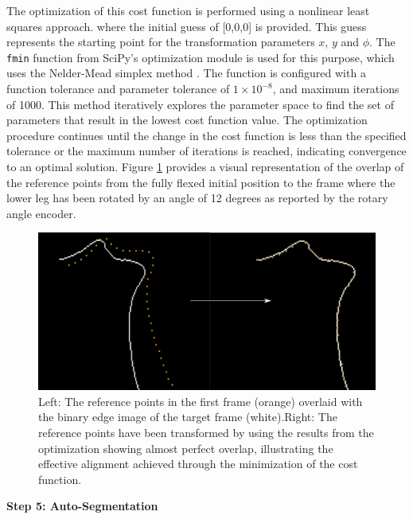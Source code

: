 \documentclass{micro-econ-thesis}
\begin{document}
The optimization of this cost function is performed using a nonlinear least squares approach. where the initial guess of [0,0,0] is provided. This guess represents the starting point for the transformation parameters $x$, $y$ and $\phi$. The \texttt{fmin} function from SciPy’s optimization module is used for this purpose, which uses the Nelder-Mead simplex method \parencite{nelder_simplex_1965}.   The function is configured with a function tolerance and parameter tolerance of $1 \times 10^{-8}$, and maximum iterations of 1000. This method iteratively explores the parameter space to find the set of parameters that result in the lowest cost function value. The optimization procedure continues until the change in the cost function is less than the specified tolerance or the maximum number of iterations is reached, indicating convergence to an optimal solution. Figure \ref{fig:edge_tracking} provides a visual representation of the overlap of the reference points from the fully flexed initial position to the frame where the lower leg has been rotated by an angle of 12 degrees as reported by the rotary angle encoder. 
\begin{figure}[H]
	\centering
	\includegraphics[width=0.7\linewidth]{image137}
	\caption{Left: The reference points in the first frame (orange) overlaid with the binary edge image of the target frame (white).Right: The reference points have been transformed by using the results from the optimization showing almost perfect overlap, illustrating the effective alignment achieved through the minimization of the cost function.}
	\label{fig:edge_tracking}
\end{figure}

\textbf{Step 5: Auto-Segmentation }
\end{document}
